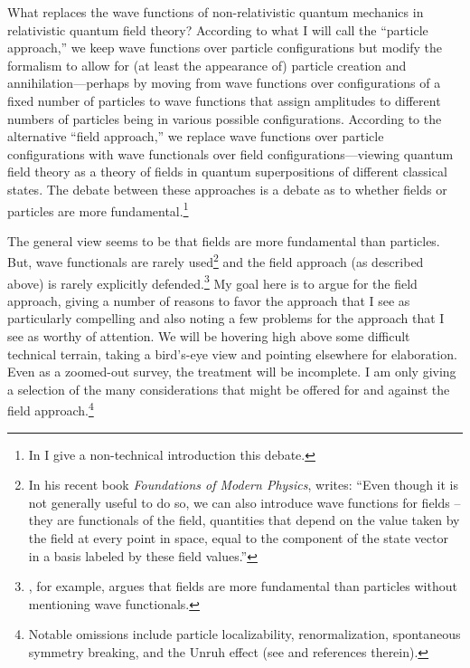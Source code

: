 \documentclass[onecolumn,secnumarabic,amsmath,amssymb,balancelastpage,nofootinbib,12pt]{article}
\begin{document}
What replaces the wave functions of non-relativistic quantum mechanics in relativistic quantum field theory?  According to what I will call the ``particle approach,'' we keep wave functions over particle configurations but modify the formalism to allow for (at least the appearance of) particle creation and annihilation---perhaps by moving from wave functions over configurations of a fixed number of particles to wave functions that assign amplitudes to different numbers of particles being in various possible configurations.  According to the alternative ``field approach,'' we replace wave functions over particle configurations with wave functionals over field configurations---viewing quantum field theory as a theory of fields in quantum superpositions of different classical states.  The debate between these approaches is a debate as to whether fields or particles are more fundamental.\footnote{In \citet{sebensAeon} I give a non-technical introduction this debate.}

The general view seems to be that fields are more fundamental than particles.  But, wave functionals are rarely used\footnote{In his recent book \emph{Foundations of Modern Physics}, \citet[pg.\ 251--252]{weinberg2021} writes: ``Even though it is not generally useful to do so, we can also introduce wave functions for fields -- they are functionals of the field, quantities that depend on the value taken by the field at every point in space, equal to the component of the state vector in a basis labeled by these field values.''} and the field approach (as described above) is rarely explicitly defended.\footnote{\citet{hobson2013}, for example, argues that fields are more fundamental than particles without mentioning wave functionals.}  My goal here is to argue for the field approach, giving a number of reasons to favor the approach that I see as particularly compelling and also noting a few problems for the approach that I see as worthy of attention.  We will be hovering high above some difficult technical terrain, taking a bird's-eye view and pointing elsewhere for elaboration.  Even as a zoomed-out survey, the treatment will be incomplete.  I am only giving a selection of the many considerations that might be offered for and against the field approach.\footnote{Notable omissions include particle localizability, renormalization, spontaneous symmetry breaking, and the Unruh effect (see \citealp{barrett2002, lupher2010, earman2011unruh, ruetsche2011, myrvold2015, baker2016, wallace2021, wallace2022} and references therein).}
\end{document}
